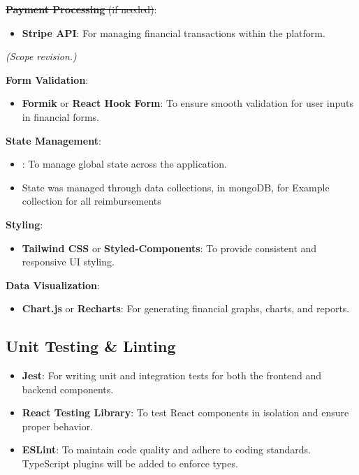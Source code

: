 \documentclass{article}
\begin{document}
{\color{red}%
  \sout {\textbf{Payment Processing} (if needed)}:
    \begin{itemize}
      \item \textbf{Stripe API}: For managing financial transactions within the platform.
    \end{itemize}
    \emph{(Scope revision.)}%
}

\textbf{Form Validation}:
\begin{itemize}
  \item \textbf{Formik} or \textbf{React Hook Form}: To ensure smooth validation for user inputs in financial forms.
\end{itemize}

\textbf{State Management}:
\begin{itemize}
  \item \sout{}: To manage global state across the application.
  \item State was managed through data collections, in mongoDB, for Example collection for all reimbursements
\end{itemize}

\textbf{Styling}:
\begin{itemize}
  \item \textbf{Tailwind CSS} or \textbf{Styled-Components}: To provide consistent and responsive UI styling.
\end{itemize}


{\color{red}%
  \textbf{Data Visualization}:
  \begin{itemize}
    \item \textbf{Chart.js} or \textbf{Recharts}: For generating financial graphs, charts, and reports.
  \end{itemize}%
}

\subsection{Unit Testing \& Linting}
\begin{itemize}
  \item \textbf{Jest}: For writing unit and integration tests for both the frontend and backend components.
  \item \textbf{React Testing Library}: To test React components in isolation and ensure proper behavior.
  \item \textbf{ESLint}: To maintain code quality and adhere to coding standards. TypeScript plugins will be added to enforce types.
\end{itemize}
\end{document}
